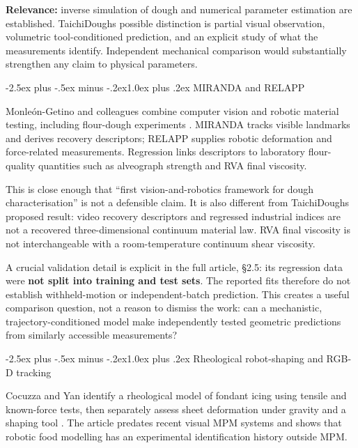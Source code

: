 \documentclass[
  11pt,
]{article}
\makeatletter
\renewcommand\subsection{\needspace{5\baselineskip}\@startsection{subsection}{2}{\z@}%
  {-2.5ex plus -.5ex minus -.2ex}{1.0ex plus .2ex}%
  {\normalfont\sffamily\large\bfseries\color{accent}}}
\makeatother
\begin{document}
\textbf{Relevance:} inverse simulation of dough and numerical parameter
estimation are established. TaichiDough\textquotesingle s possible
distinction is partial visual observation, volumetric tool-conditioned
prediction, and an explicit study of what the measurements identify.
Independent mechanical comparison would substantially strengthen any
claim to physical parameters.

\subsection{MIRANDA and RELAPP}\label{miranda-and-relapp}

Monleón-Getino and colleagues combine computer vision and robotic
material testing, including flour-dough experiments
. MIRANDA tracks visible landmarks
and derives recovery descriptors; RELAPP supplies robotic deformation
and force-related measurements. Regression links descriptors to
laboratory flour-quality quantities such as alveograph strength and RVA
final viscosity.

This is close enough that ``first vision-and-robotics framework for
dough characterisation'' is not a defensible claim. It is also different
from TaichiDough\textquotesingle s proposed result: video recovery
descriptors and regressed industrial indices are not a recovered
three-dimensional continuum material law. RVA final viscosity is not
interchangeable with a room-temperature continuum shear viscosity.

A crucial validation detail is explicit in the full article, §2.5: its
regression data were \textbf{not split into training and test sets}. The
reported fits therefore do not establish withheld-motion or
independent-batch prediction. This creates a useful comparison question,
not a reason to dismiss the work: can a mechanistic,
trajectory-conditioned model make independently tested geometric
predictions from similarly accessible measurements?

\subsection{Rheological robot-shaping and RGB-D
tracking}\label{rheological-robot-shaping-and-rgb-d-tracking}

Cocuzza and Yan identify a rheological model of fondant icing using
tensile and known-force tests, then separately assess sheet deformation
under gravity and a shaping tool .
The article predates recent visual MPM systems and shows that robotic
food modelling has an experimental identification history outside MPM.
\end{document}
